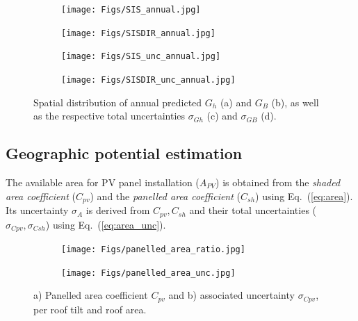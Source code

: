 \begin{figure}[tb]
\centering
\begin{subfigure}{.49\textwidth}
  \centering
  \texttt{[image: Figs/SIS\_annual.jpg]}  
  \subcaption{}
\end{subfigure}
\begin{subfigure}{.49\textwidth}
  \centering
  \texttt{[image: Figs/SISDIR\_annual.jpg]}  
  \subcaption{}
\end{subfigure}
\begin{subfigure}{.49\textwidth}
  \centering
  \texttt{[image: Figs/SIS\_unc\_annual.jpg]} 
  \subcaption{}
\end{subfigure}
\begin{subfigure}{.49\textwidth}
  \centering
  \texttt{[image: Figs/SISDIR\_unc\_annual.jpg]}  
  \subcaption{}
\end{subfigure}
\caption{Spatial distribution of annual predicted $G_h$ (a) and $G_B$ (b), as well as the respective total uncertainties $\sigma_{Gh}$ (c) and $\sigma_{GB}$ (d).}
\label{fig:Gh_GB}
\end{figure}


\subsection{Geographic potential estimation}
\label{solar_geo}


The available area for PV panel installation ($A_{PV}$) is obtained from the \textit{shaded area coefficient} ($C_{\mathit{pv}}$) and the \textit{panelled area coefficient} ($C_{sh}$) using Eq.~(\ref{eq:area}). Its uncertainty $\sigma_{A}$ is derived from $C_{\mathit{pv}}, C_{sh}$ and their total uncertainties ($\sigma_{\mathit{Cpv}}, \sigma_{\mathit{Csh}}$) using Eq.~(\ref{eq:area_unc}).

\begin{figure}[tb]
\centering
\begin{subfigure}{.49\textwidth}
  \centering
  \texttt{[image: Figs/panelled\_area\_ratio.jpg]}
  \subcaption{}
\end{subfigure}
\begin{subfigure}{.49\textwidth}
  \centering
  \texttt{[image: Figs/panelled\_area\_unc.jpg]}  
  \subcaption{}
\end{subfigure}
\caption{a) Panelled area coefficient $C_{\mathit{pv}}$ and b) associated uncertainty $\sigma_{\mathit{Cpv}}$, per roof tilt and roof area.}
\label{fig:C_pv}
\end{figure}

